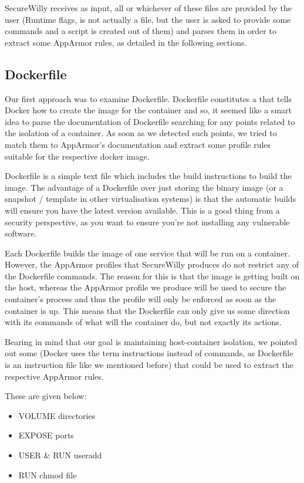 SecureWilly receives as input, all or whichever of these files are provided by the user (Runtime flags, is not actually a file, but the user is asked to provide some commands and a script is created out of them) and parses them in order to extract some AppArmor rules, as detailed in the following sections. 

\subsection{Dockerfile}
Our first approach was to examine Dockerfile. Dockerfile constitutes a  that tells Docker how to create the image for the container and so, it seemed like a smart idea to parse the documentation of Dockerfile searching for any points related to the isolation of a container. As soon as we detected such points, we tried to match them to AppArmor's documentation and extract some profile rules suitable for the respective docker image.

Dockerfile is a simple text file which includes the build instructions to build the image. The advantage of a Dockerfile over just storing the binary image (or a snapshot / template in other virtualisation systems) is that the automatic builds will ensure you have the latest version available. This is a good thing from a security perspective, as you want to ensure you're not installing any vulnerable software. \cite{whatsdockerfile}

Each Dockerfile builds the image of one service that will be run on a container. However, the AppArmor profiles that SecureWilly produces do not restrict any of the Dockerfile commands. The reason for this is that the image is getting built on the host, whereas the AppArmor profile we produce will be used to secure the container's process and thus the profile will only be enforced as soon as the container is up. This means that the Dockerfile can only give us some direction with its commands of what will the container do, but not exactly its actions.

Bearing in mind that our goal is maintaining host-container isolation, we pointed out some  (Docker uses the term instructions instead of commands, as Dockerfile is an instruction file like we mentioned before) that could be used to extract the respective AppArmor rules.

These  are given below:
\begin{itemize}
\item VOLUME directories
\item EXPOSE ports
\item USER \& RUN useradd
\item RUN chmod file
\end{itemize}

